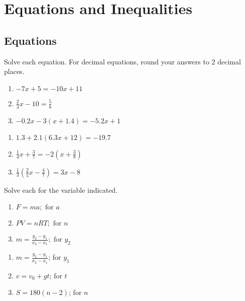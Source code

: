 \chapter{Equations and Inequalities}

\section*{Equations}

Solve each equation. For decimal equations, round your answers to 2 decimal places.

\begin{multicols}{3}
\begin{enumerate}
	\item $-7x + 5 = -10x + 11$
	\item $\frac{2}{3}x - 10 = \frac{5}{8}$
	\item $-0.2x - 3(x+1.4) = -5.2x + 1$
\end{enumerate}	\setcounter{Review}{\value{enumi}}
\end{multicols}
\begin{multicols}{3}
\begin{enumerate}	\setcounter{enumi}{\value{Review}}
	\item $1.3 + 2.1(6.3x + 12) = -19.7$
	\item $\frac{1}{4}x + \frac{3}{7} = -2\left(x + \frac{3}{8}\right)$
	\item $\frac{1}{3}\left(\frac{2}{5}x-\frac{4}{7}\right) = 3x - 8$
\end{enumerate}	\setcounter{Review}{\value{enumi}}
\end{multicols}


Solve each for the variable indicated.

\begin{multicols}{3}
\begin{enumerate}	\setcounter{enumi}{\value{Review}}
	\item $F = ma; \text{ for } a$
	\item $PV = nRT; \text{ for } n$
	\item $m = \frac{y_2-y_1}{x_2-x_1}; \text{ for } y_2$
\end{enumerate}	\setcounter{Review}{\value{enumi}}
\end{multicols}
\begin{multicols}{3}
\begin{enumerate}	\setcounter{enumi}{\value{Review}}
	\item $m = \frac{y_2-y_1}{x_2-x_1}$; for $y_1$
    \item $v = v_0 + gt$; for $t$
    \item $S = 180(n-2)$; for $n$
\end{enumerate}	\setcounter{Review}{\value{enumi}}
\end{multicols}




